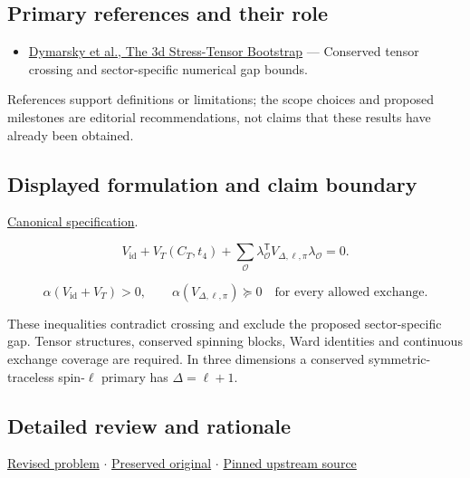 \documentclass[
  11pt,
]{article}
\providecommand{\tightlist}{%
  \setlength{\itemsep}{0pt}\setlength{\parskip}{0pt}}
\begin{document}
\subsection{Primary references and their role}

\begin{itemize}
\tightlist
\item
  \href{https://arxiv.org/abs/1708.05718}{Dymarsky et al., The 3d
  Stress-Tensor Bootstrap} --- Conserved tensor crossing and
  sector-specific numerical gap bounds.
\end{itemize}

References support definitions or limitations; the scope choices and
proposed milestones are editorial recommendations, not claims that these
results have already been obtained.

\subsection{Displayed formulation and claim boundary}

\href{https://github.com/rick-stevens-ai/Pure-Thought/blob/main/PRDs/07-Extremal-CFTs-Stress-Tensor.md}{Canonical
specification}.

\[V_{\mathrm{id}}+V_T(C_T,t_4)+
\sum_{\mathcal O}\lambda_{\mathcal O}^{\mathsf T}V_{\Delta,\ell,\pi}
\lambda_{\mathcal O}=0.\]

\[\alpha(V_{\mathrm{id}}+V_T)>0,\qquad
\alpha(V_{\Delta,\ell,\pi})\succeq0
\quad\text{for every allowed exchange}.\]

These inequalities contradict crossing and exclude the proposed
sector-specific gap. Tensor structures, conserved spinning blocks, Ward
identities and continuous exchange coverage are required. In three
dimensions a conserved symmetric-traceless spin-\(\ell\) primary has
\(\Delta=\ell+1\).

\subsection{Detailed review and rationale}

\href{https://github.com/rick-stevens-ai/Pure-Thought/blob/main/PRDs/07-Extremal-CFTs-Stress-Tensor.md}{Revised
problem} \ensuremath{\cdot}
\href{https://github.com/rick-stevens-ai/Pure-Thought/blob/main/archive/original-PRDs/07-Extremal-CFTs-Stress-Tensor.md}{Preserved
original} \ensuremath{\cdot}
\href{https://github.com/rick-stevens-ai/Pure-Thought/blob/f854d4e12b55c1f5b5c2a964b75f2d23496d981e/PRDs/07-Extremal-CFTs-Stress-Tensor.md}{Pinned
upstream source}
\end{document}
